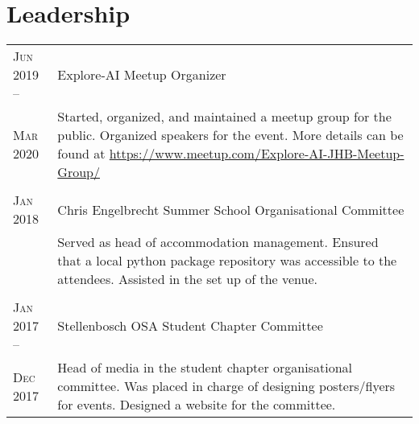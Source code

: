 \section{Leadership}

\begin{tabular}{p{1.8cm}|p{12cm}}
	\textsc{Jun 2019 --} & Explore-AI Meetup Organizer\\
	\textsc{Mar 2020}& \small{Started, organized, and maintained a meetup group for the public. Organized speakers for the event. More details can be found at \href{https://www.meetup.com/Explore-AI-JHB-Meetup-Group/}{https://www.meetup.com/Explore-AI-JHB-Meetup-Group/}} \\
	\multicolumn{2}{c}{} \\
	\textsc{Jan 2018} & Chris Engelbrecht Summer School Organisational Committee \\
	& \small{Served as head of accommodation management. Ensured that a local python package repository was accessible to the attendees. Assisted in the set up of the venue.} \\
	\multicolumn{2}{c}{} \\
	\textsc{Jan 2017 --} & Stellenbosch OSA Student Chapter Committee \\
	\textsc{Dec 2017} & \small{Head of media in the student chapter organisational committee. Was placed in charge of designing posters/flyers for events. Designed a website for the committee.} \\
\end{tabular}